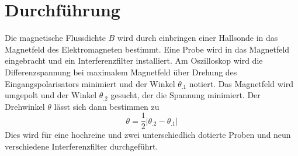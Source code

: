 \section{Durchführung}
\label{sec:Durchführung}
Die magnetische Flussdichte $B$ wird durch einbringen einer Hallsonde in das Magnetfeld des Elektromagneten bestimmt.
Eine Probe wird in das Magnetfeld eingebracht und ein Interferenzfilter installiert.
Am Oszilloskop wird die Differenzspannung bei maximalem Magnetfeld über Drehung des Eingangspolarisators minimiert und der Winkel $\theta_.1$ notiert. Das Magnetfeld wird umgepolt und der Winkel $\theta_.2$ gesucht, der die Spannung minimiert.
Der Drehwinkel $\theta$ lässt sich dann bestimmen zu
\[
\theta = \frac{1}{2} |\theta_.2 - \theta_.1|
\]
Dies wird für eine hochreine und zwei unterschiedlich dotierte Proben und neun verschiedene Interferenzfilter durchgeführt.

